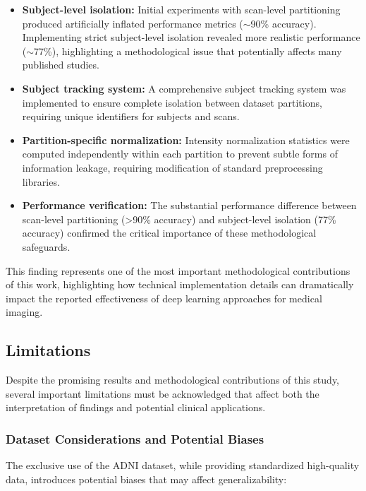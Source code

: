 \documentclass[12pt, a4paper]{article}
\begin{document}
\begin{itemize}
    \item \textbf{Subject-level isolation:} Initial experiments with scan-level partitioning produced artificially inflated performance metrics ($\sim$90\% accuracy). Implementing strict subject-level isolation revealed more realistic performance ($\sim$77\%), highlighting a methodological issue that potentially affects many published studies.
    
    \item \textbf{Subject tracking system:} A comprehensive subject tracking system was implemented to ensure complete isolation between dataset partitions, requiring unique identifiers for subjects and scans.
    
    \item \textbf{Partition-specific normalization:} Intensity normalization statistics were computed independently within each partition to prevent subtle forms of information leakage, requiring modification of standard preprocessing libraries.
    
    \item \textbf{Performance verification:} The substantial performance difference between scan-level partitioning (>90\% accuracy) and subject-level isolation (77\% accuracy) confirmed the critical importance of these methodological safeguards.
\end{itemize}

This finding represents one of the most important methodological contributions of this work, highlighting how technical implementation details can dramatically impact the reported effectiveness of deep learning approaches for medical imaging.

\subsection{Limitations}

Despite the promising results and methodological contributions of this study, several important limitations must be acknowledged that affect both the interpretation of findings and potential clinical applications.

\subsubsection{Dataset Considerations and Potential Biases}

The exclusive use of the ADNI dataset, while providing standardized high-quality data, introduces potential biases that may affect generalizability:
\end{document}
